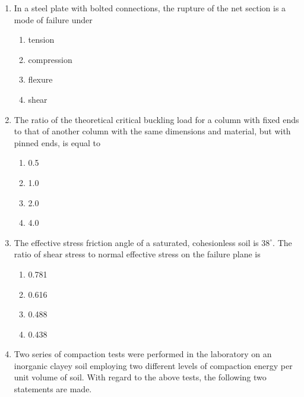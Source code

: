 \documentclass[journal]{IEEEtran}
\begin{document}
\begin{enumerate}
\begin{multicols}{1}
\begin{enumerate}
  \item Loss due to elastic shortening
\item Loss due to friction
\item  Loss due to relaxation of strands
\item  Loss due to anchorage slip 
\end{enumerate}
		\end{multicols}
\item In a steel plate with bolted connections, the rupture of the net section is a mode of failure under
\begin{multicols}{1}
			\begin{enumerate}

\item  tension
\item compression
\item flexure
\item shear
   \end{enumerate}
		\end{multicols}
  \item The ratio of the theoretical critical buckling load for a column with fixed ends to that of another column with the same dimensions and material, but with pinned ends, is equal to
  \begin{multicols}{1}
			\begin{enumerate}
   \item 0.5
\item 1.0
\item  2.0
\item 4.0
 \end{enumerate}
		\end{multicols}
  \item The effective stress friction angle of a saturated, cohesionless soil is $38^{\circ}$. The ratio of shear stress to normal effective stress on the failure plane is
  \begin{multicols}{1}
			\begin{enumerate}
   \item 0.781
\item 0.616
\item 0.488
\item 0.438
 \end{enumerate}
		\end{multicols}
  \item  Two series of compaction tests were performed in the laboratory on an inorganic clayey soil employing two different levels of compaction energy per unit volume of soil. With regard to the above tests, the following two statements are made.\\\\

\end{enumerate}
\end{document}
